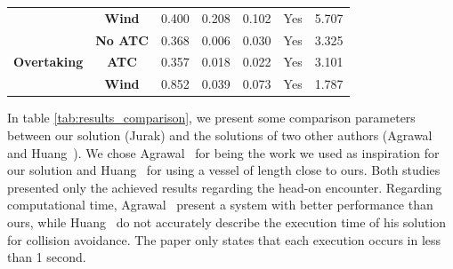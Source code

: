 \begin{table}[H]
\begin{tabular}{ccccccc}
                                                                                                        & \textbf{Wind}                   & 0.400                 & 0.208                 & 0.102                        & Yes                                                                                                   & 5.707                                                                                                    \\ 
        \cline{2-7}
        \multirow{3}{*}{\textbf{Overtaking}}                                                            & \textbf{No ATC}                 & 0.368            & 0.006            & 0.030                   & Yes                                                                                                & 3.325                                                                                               \\
                                                                                                        & \textbf{ATC}                    & 0.357            & 0.018            & 0.022                   & Yes                                                                                                & 3.101                                                                                               \\
                                                                                                        & \textbf{Wind}                   & 0.852            & 0.039            & 0.073                   & Yes                                                                                                & 1.787                                                                                               \\
        \bottomrule
        \end{tabular}
        \end{table}
        
        In table \ref{tab:results_comparison}, we present some comparison parameters between our solution (Jurak) and the solutions of two other authors (Agrawal~\etal{} and Huang~\etal {}). We chose Agrawal~\etal{} for being the work we used as inspiration for our solution and Huang~\etal{} for using a vessel of length close to ours. Both studies presented only the achieved results regarding the head-on encounter. Regarding computational time, Agrawal~\etal{} present a system with better performance than ours, while Huang~\etal{} do not accurately describe the execution time of his solution for collision avoidance. The paper only states that each execution occurs in less than 1 second.
        
